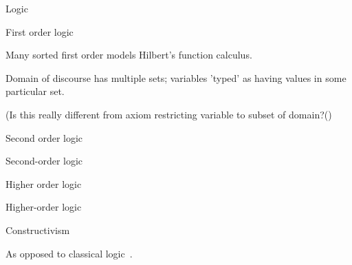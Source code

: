 \begin{plSection}{Logic}
\begin{plSection}{First order logic}
\begin{plSection}{Many sorted first order models}
Hilbert's function calculus.~\cite{sep:EmergenceOfFirstOrderLOgic}

Domain of discourse has multiple sets;
variables 'typed' as having values in some particular 
set.~\cite{sep:modeltheory_fo}

(Is this really different from
axiom restricting variable to subset of domain?()

\end{plSection}%
\end{plSection}%
\begin{plSection}{Second order logic}
\label{sec:Second_order_logic}

Second-order logic~\cite{wiki:SecondOrderLogic,
wiki:SecondOrderPropositionalLogic}

\end{plSection}%
\begin{plSection}{Higher order logic}
\label{sec:Higher_order_logic}

Higher-order logic~\cite{wiki:HigherOrderLogic}

\end{plSection}%
\begin{plSection}{Constructivism}
\label{sec:Constructivism_logic}

\cite{Feferman:2000:ConstructivePredicativeClassicalAnalysis,Diez:2002:Constructivism,sep:ConstructiveMathematics,
wiki:ConstructivismPhilosophyOfMathematics}

As opposed to classical logic~\cite{wiki:ClassicalLogic}.
\end{plSection}%
\end{plSection}%
 